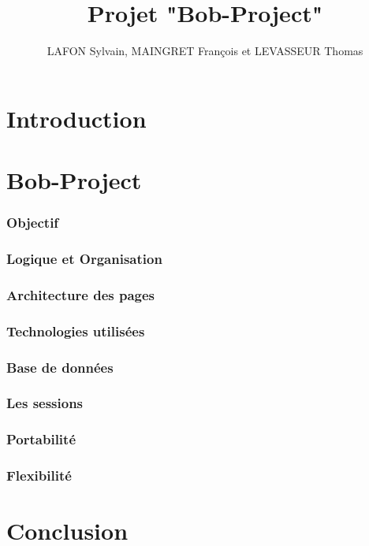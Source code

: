 \documentclass[10pt,a4paper]{article}
\author{LAFON Sylvain, MAINGRET François et LEVASSEUR Thomas}
\title{Projet "Bob-Project"}
\begin{document}
\maketitle
\tableofcontents
\newpage
	\part{Introduction}
		
	
	\part{Bob-Project}
		\section{Objectif}
			
		\section{Logique et Organisation}
					
		\section{Architecture des pages}
			
		\section{Technologies utilisées}
			
		\section{Base de données}
			
		\section{Les sessions}
			
		\section{Portabilité}
			
		\section{Flexibilité} %
			
		
	\part{Conclusion}
		
\end{document}
